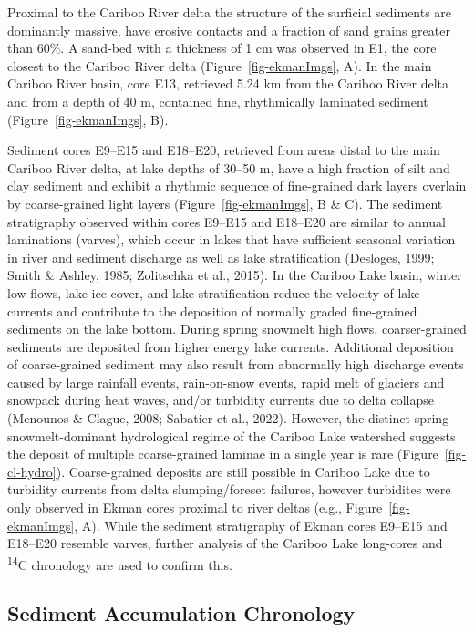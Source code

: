 \documentclass[
  letterpaper,
  DIV=11,
  numbers=noendperiod]{scrartcl}
\begin{document}
Proximal to the Cariboo River delta the structure of the surficial
sediments are dominantly massive, have erosive contacts and a fraction
of sand grains greater than 60\%. A sand-bed with a thickness of 1 cm
was observed in E1, the core closest to the Cariboo River delta
(Figure~\ref{fig-ekmanImgs}, A). In the main Cariboo River basin, core
E13, retrieved 5.24 km from the Cariboo River delta and from a depth of
40 m, contained fine, rhythmically laminated sediment
(Figure~\ref{fig-ekmanImgs}, B).

Sediment cores E9--E15 and E18--E20, retrieved from areas distal to the
main Cariboo River delta, at lake depths of 30--50 m, have a high
fraction of silt and clay sediment and exhibit a rhythmic sequence of
fine-grained dark layers overlain by coarse-grained light layers
(Figure~\ref{fig-ekmanImgs}, B \& C). The sediment stratigraphy observed
within cores E9--E15 and E18--E20 are similar to annual laminations
(varves), which occur in lakes that have sufficient seasonal variation
in river and sediment discharge as well as lake stratification
(Desloges, 1999; Smith \& Ashley, 1985; Zolitschka et al., 2015). In the
Cariboo Lake basin, winter low flows, lake-ice cover, and lake
stratification reduce the velocity of lake currents and contribute to
the deposition of normally graded fine-grained sediments on the lake
bottom. During spring snowmelt high flows, coarser-grained sediments are
deposited from higher energy lake currents. Additional deposition of
coarse-grained sediment may also result from abnormally high discharge
events caused by large rainfall events, rain-on-snow events, rapid melt
of glaciers and snowpack during heat waves, and/or turbidity currents
due to delta collapse (Menounos \& Clague, 2008; Sabatier et al., 2022).
However, the distinct spring snowmelt-dominant hydrological regime of
the Cariboo Lake watershed suggests the deposit of multiple
coarse-grained laminae in a single year is rare
(Figure~\ref{fig-cl-hydro}). Coarse-grained deposits are still possible
in Cariboo Lake due to turbidity currents from delta slumping/foreset
failures, however turbidites were only observed in Ekman cores proximal
to river deltas (e.g., Figure~\ref{fig-ekmanImgs}, A). While the
sediment stratigraphy of Ekman cores E9--E15 and E18--E20 resemble
varves, further analysis of the Cariboo Lake long-cores and
\textsuperscript{14}C chronology are used to confirm this.

\subsection{Sediment Accumulation
Chronology}\label{sediment-accumulation-chronology}
\end{document}
